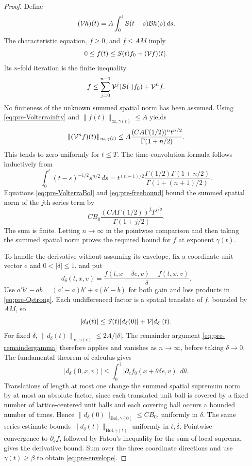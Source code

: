 \begin{proof}
Define
\[
 ({\cal V}h)(t)=A\int_0^t S(t-s){\cal B}h(s)\,ds.
\]
The characteristic equation, $f\geq0$, and $f\leq AM$ imply
\begin{equation}\label{eq:pre-linearcomparison}
 0\leq f(t)\leq S(t)f_0+({\cal V}f)(t).
\end{equation}
Its $n$-fold iteration is the finite inequality
\[
 f\leq\sum_{j=0}^{n-1}{\cal V}^j(S(\cdot)f_0)+{\cal V}^n f.
\]
No finiteness of the unknown summed spatial norm has been assumed.
Using \eqref{eq:pre-Volterrainfty} and
$\|f(t)\|_{\infty,\gamma(t)}\leq A$ yields
\begin{equation}\label{eq:pre-remaindergamma}
 \|({\cal V}^n f)(t)\|_{\infty,\gamma(t)}
       \leq A\frac{(CA\Gamma(1/2))^nt^{n/2}}
                           {\Gamma(1+n/2)}.
\end{equation}
This tends to zero uniformly for $t\leq T$.
The time-convolution formula follows inductively from
\[
 \int_0^t(t-s)^{-1/2}s^{n/2}\,ds
 =t^{(n+1)/2}
       \frac{\Gamma(1/2)\Gamma(1+n/2)}
            {\Gamma(1+(n+1)/2)}.
\]
Equations \eqref{eq:pre-VolterraBol} and
\eqref{eq:pre-freebound} bound the summed spatial norm of the
$j$th series term by
\[
 C B_0\frac{(CA\Gamma(1/2))^jT^{j/2}}{\Gamma(1+j/2)}.
\]
The sum is finite. Letting $n\to\infty$ in the pointwise comparison
and then taking the summed spatial norm proves the required bound
for $f$ at exponent $\gamma(t)$.

To handle the derivative without assuming its envelope, fix a
coordinate unit vector $e$ and $0<|\delta|\leq1$, and put
\[
 d_\delta(t,x,v)
       =\frac{f(t,x+\delta e,v)-f(t,x,v)}{\delta}.
\]
Use $a'b'-ab=(a'-a)b'+a(b'-b)$ for both gain and loss products in
\eqref{eq:pre-Qstrong}. Each undifferenced factor is a spatial
translate of $f$, bounded by $AM$, so
\[
 |d_\delta(t)|
       \leq S(t)|d_\delta(0)|+{\cal V}|d_\delta|(t).
\]
For fixed $\delta$,
$\|d_\delta(t)\|_{\infty,\gamma(t)}\leq2A/|\delta|$.
The remainder argument \eqref{eq:pre-remaindergamma} therefore
applies and vanishes as $n\to\infty$, before taking $\delta\to0$.
The fundamental theorem of calculus gives
\[
 |d_\delta(0,x,v)|
       \leq\int_0^1|\partial_e f_0(x+\theta\delta e,v)|\,d\theta.
\]
Translations of length at most one change the summed spatial
supremum norm by at most an absolute factor, since each translated
unit ball is covered by a fixed number of lattice-centered unit
balls and each covering ball occurs a bounded number of times.
Hence
$\|d_\delta(0)\|_{\mathrm{Bol},\gamma(0)}\leq CB_0$,
uniformly in $\delta$.
The same series estimate bounds
$\|d_\delta(t)\|_{\mathrm{Bol},\gamma(t)}$ uniformly in $t,\delta$.
Pointwise convergence to $\partial_e f$, followed by Fatou's
inequality for the sum of local suprema, gives the derivative
bound. Sum over the three coordinate directions and use
$\gamma(t)\geq\beta$ to obtain \eqref{eq:pre-envelope}.
\end{proof}

